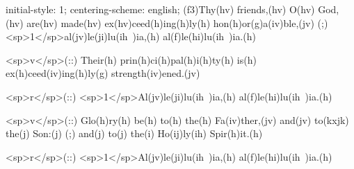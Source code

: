initial-style: 1;
centering-scheme: english;
(f3)Thy(hv) friends,(hv) O(hv) God,(hv) are(hv) made(hv) ex(hv)ceed(h)ing(h)ly(h) hon(h)or(g)a(iv)ble,(jv) (;) <sp>1</sp>al(jv)le(ji)lu(ih~)ia,(h) al(f)le(hi)lu(ih~)ia.(h)

<sp>v</sp>(::) Their(h) prin(h)ci(h)pal(h)i(h)ty(h) is(h) ex(h)ceed(iv)ing(h)ly(g) strength(iv)ened.(jv)

<sp>r</sp>(::) <sp>1</sp>Al(jv)le(ji)lu(ih~)ia,(h) al(f)le(hi)lu(ih~)ia.(h)

<sp>v</sp>(::) Glo(h)ry(h) be(h) to(h) the(h) Fa(iv)ther,(jv) and(jv) to(kxjk) the(j) Son:(j) (;) and(j) to(j) the(i) Ho(ij)ly(ih) Spir(h)it.(h)

<sp>r</sp>(::) <sp>1</sp>Al(jv)le(ji)lu(ih~)ia,(h) al(f)le(hi)lu(ih~)ia.(h)